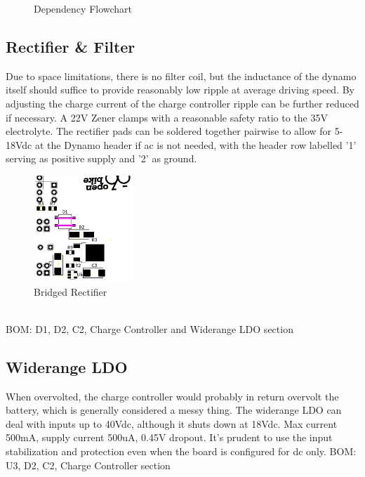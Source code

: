 \documentclass{article}
\begin{document}
\begin{figure}[h]
    \caption{Dependency Flowchart}
\end{figure}

\subsection{Rectifier \& Filter}
Due to space limitations, there is no filter coil, but the inductance of the dynamo itself should suffice to provide reasonably low ripple at average driving speed. By adjusting the charge current of the charge controller ripple can be further reduced if necessary. A 22V Zener clamps with a reasonable safety ratio to the 35V electrolyte. The rectifier pads can be soldered together pairwise to allow for 5-18Vdc at the Dynamo header if ac is not needed, with the header row labelled '1' serving as positive supply and '2' as ground.
\begin{figure}[h]
\centering
\includegraphics[height=4cm] {bridge.png}
\caption{Bridged Rectifier}
\end{figure}
\\BOM: D1, D2, C2, Charge Controller and Widerange LDO section

\subsection{Widerange LDO}
When overvolted, the charge controller would probably in return overvolt the battery, which is generally considered a messy thing. The widerange LDO can deal with inputs up to 40Vdc, although it shuts down at 18Vdc. Max current 500mA, supply current 500uA, 0.45V dropout. It's prudent to use the input stabilization and protection even when the board is configured for dc only.
\newline \newline
BOM: U3, D2, C2, Charge Controller section
\end{document}
